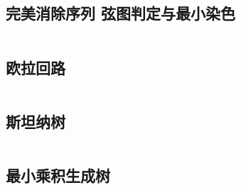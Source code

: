 \documentclass[titlepage, a4paper]{article}
\begin{document}
\begin{multicols}{2}
\begin{spacing}{0.6}
				\subsection{完美消除序列 弦图判定与最小染色}
				\inputminted{cpp}{src/TreeandGraph/弦图.cpp}
				\subsection{欧拉回路}
				\inputminted{cpp}{src/TreeandGraph/欧拉回路.cpp}
				\subsection{斯坦纳树}
				\inputminted{cpp}{src/TreeandGraph/斯坦纳树.cpp}
				\subsection{最小乘积生成树}
				\inputminted{cpp}{src/TreeandGraph/最小乘积生成树.cpp}

\end{spacing}
\end{multicols}
\end{document}
